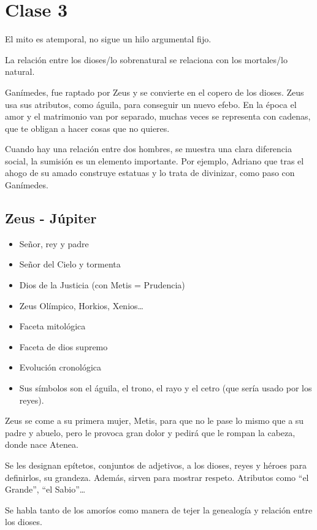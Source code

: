 \chapter{Clase 3}\label{ch:clase3}
El mito es atemporal, no sigue un hilo argumental fijo.

La relación entre los dioses/lo sobrenatural se relaciona con los mortales/lo natural.

Ganímedes, fue raptado por Zeus y se convierte en el copero de los dioses. Zeus usa sus atributos, como águila, para conseguir un nuevo efebo. En la época el amor y el matrimonio van por separado, muchas veces se representa con cadenas, que te obligan a hacer cosas que no quieres.

Cuando hay una relación entre dos hombres, se muestra una clara diferencia social, la sumisión es un elemento importante. Por ejemplo, Adriano que tras el ahogo de su amado construye estatuas y lo trata de divinizar, como paso con Ganímedes.

\section{Zeus - Júpiter}
\begin{itemize}
	\item Señor, rey y padre
	\item Señor del Cielo y tormenta
	\item Dios de la Justicia (con Metis = Prudencia)
	\item Zeus Olímpico, Horkios, Xenios\dots
	\item Faceta mitológica
	\item Faceta de dios supremo
	\item Evolución cronológica
	\item Sus símbolos son el águila, el trono, el rayo y el cetro (que sería usado por los reyes).
\end{itemize}

Zeus se come a su primera mujer, Metis, para que no le pase lo mismo que a su padre y abuelo, pero le provoca gran dolor y pedirá que le rompan la cabeza, donde nace Atenea.

Se les designan epítetos, conjuntos de adjetivos, a los dioses, reyes y héroes para definirlos, su grandeza. Además, sirven para mostrar respeto. Atributos como \enquote{el Grande}, \enquote{el Sabio}\dots

Se habla tanto de los amoríos como manera de tejer la genealogía y relación entre los dioses.

